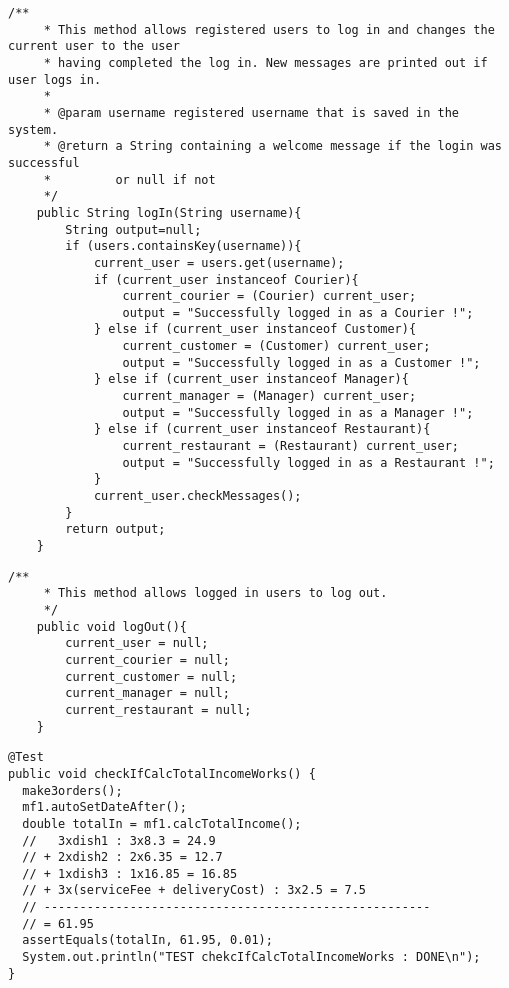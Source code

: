\begin{lstlisting}[caption=the main methods for the log in log out system.,
  label=lst:login]
/**
	 * This method allows registered users to log in and changes the current user to the user 
	 * having completed the log in. New messages are printed out if user logs in.
	 * 
	 * @param username registered username that is saved in the system.
	 * @return a String containing a welcome message if the login was successful
	 * 		   or null if not
	 */
	public String logIn(String username){
		String output=null;
		if (users.containsKey(username)){
			current_user = users.get(username);
			if (current_user instanceof Courier){
				current_courier = (Courier) current_user;
				output = "Successfully logged in as a Courier !";
			} else if (current_user instanceof Customer){
				current_customer = (Customer) current_user;
				output = "Successfully logged in as a Customer !";
			} else if (current_user instanceof Manager){
				current_manager = (Manager) current_user;
				output = "Successfully logged in as a Manager !";
			} else if (current_user instanceof Restaurant){
				current_restaurant = (Restaurant) current_user;
				output = "Successfully logged in as a Restaurant !";
			}
			current_user.checkMessages(); 
		}
		return output;
	}
\end{lstlisting}

\begin{lstlisting}[caption=the main methods for the log in log out system.,
  label=lst:logout]
	/**
	 * This method allows logged in users to log out.
	 */
	public void logOut(){
		current_user = null;
		current_courier = null;
		current_customer = null;
		current_manager = null;
		current_restaurant = null;
	}
\end{lstlisting}




\begin{lstlisting}[caption=Example of a test using \texttt{assertEquals} with 2 decimal precision.,
  label=lst:test_total_income]
@Test
public void checkIfCalcTotalIncomeWorks() {
  make3orders();
  mf1.autoSetDateAfter();
  double totalIn = mf1.calcTotalIncome();
  //   3xdish1 : 3x8.3 = 24.9
  // + 2xdish2 : 2x6.35 = 12.7
  // + 1xdish3 : 1x16.85 = 16.85
  // + 3x(serviceFee + deliveryCost) : 3x2.5 = 7.5
  // ------------------------------------------------------
  // = 61.95
  assertEquals(totalIn, 61.95, 0.01);
  System.out.println("TEST chekcIfCalcTotalIncomeWorks : DONE\n");
}
\end{lstlisting}

  
  
  
\lstset{basicstyle=\rm\small\ttfamily}
